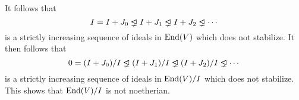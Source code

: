 \begin{example}
  It follows that
  \[
                I
    =           I + J_0
    \ideallneq  I + J_1
    \ideallneq  I + J_2
    \ideallneq  \dotsb
  \]
  is a strictly increasing sequence of ideals in $\operatorname{End}(V)$ which does not stabilize.
  It then follows that
  \[
                0
    =           (I + J_0)/I
    \ideallneq  (I + J_1)/I
    \ideallneq  (I + J_2)/I
    \ideallneq  \dotsb
  \]
  is a strictly increasing sequence of ideals in $\operatorname{End}(V)/I$ which does not stabilize.
  This shows that $\operatorname{End}(V)/I$ is not noetherian.
\end{example}




